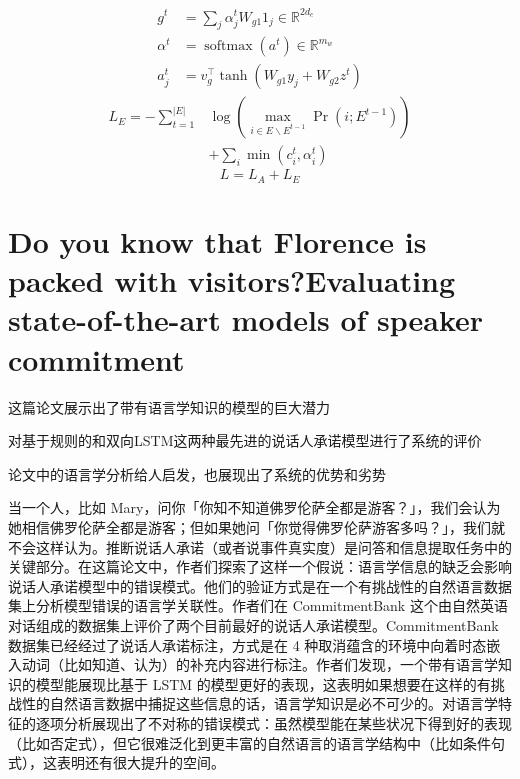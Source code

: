 \documentclass[a4paper,UTF8]{article}
\numberwithin{equation}{section}
\begin{document}
	\begin{equation}
	\begin{aligned} g^{t} &=\sum_{j} \alpha_{j}^{t} W_{g 1} 1_{j} \in \mathbb{R}^{2 d_{c}} \\ \alpha^{t} &=\operatorname{softmax}\left(a^{t}\right) \in \mathbb{R}^{m_{w}} \\ a_{j}^{t} &=v_{g}^{\top} \tanh \left(W_{g 1} y_{j}+W_{g 2} z^{t}\right) \end{aligned}
	\end{equation}
	\begin{equation}
	\begin{aligned} L_{E}=-\sum_{t=1}^{|E|} & \log \left(\max _{i \in E \backslash E^{t-1}} \operatorname{Pr}\left(i ; E^{t-1}\right)\right) \\ &+\sum_{i} \min \left(c_{i}^{t}, \alpha_{i}^{t}\right) \end{aligned}
	\end{equation}
	\begin{equation}
		L=L_{A}+L_{E}
		\end{equation}

\newpage
\section{Do you know that Florence is packed with visitors?Evaluating state-of-the-art models of speaker commitment}
这篇论文展示出了带有语言学知识的模型的巨大潜力

对基于规则的和双向LSTM这两种最先进的说话人承诺模型进行了系统的评价

论文中的语言学分析给人启发，也展现出了系统的优势和劣势

当一个人，比如 Mary，问你「你知不知道佛罗伦萨全都是游客？」，我们会认为她相信佛罗伦萨全都是游客；但如果她问「你觉得佛罗伦萨游客多吗？」，我们就不会这样认为。推断说话人承诺（或者说事件真实度）是问答和信息提取任务中的关键部分。在这篇论文中，作者们探索了这样一个假说：语言学信息的缺乏会影响说话人承诺模型中的错误模式。他们的验证方式是在一个有挑战性的自然语言数据集上分析模型错误的语言学关联性。作者们在 CommitmentBank 这个由自然英语对话组成的数据集上评价了两个目前最好的说话人承诺模型。CommitmentBank 数据集已经经过了说话人承诺标注，方式是在 4 种取消蕴含的环境中向着时态嵌入动词（比如知道、认为）的补充内容进行标注。作者们发现，一个带有语言学知识的模型能展现比基于 LSTM 的模型更好的表现，这表明如果想要在这样的有挑战性的自然语言数据中捕捉这些信息的话，语言学知识是必不可少的。对语言学特征的逐项分析展现出了不对称的错误模式：虽然模型能在某些状况下得到好的表现（比如否定式），但它很难泛化到更丰富的自然语言的语言学结构中（比如条件句式），这表明还有很大提升的空间。
\end{document}
